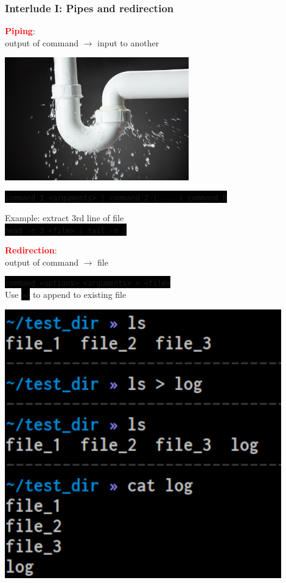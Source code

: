 \documentclass[unknownkeysallowed, 10pt, a4 paper, handout]{beamer}
\newcommand{\focus}[1]{\textbf{\textcolor{red}{#1}}}
\newcommand{\ra}{$\longrightarrow$ }
\newcommand{\code}[1]{\colorbox{black}{\color{green}\texttt{#1}}}
\newcommand{\sidebyside}[5]{
  \begin{minipage}{#1\textwidth}
    #2
  \end{minipage} #3 \begin{minipage}{#4\textwidth}
    #5
  \end{minipage}
}
\begin{document}
\begin{frame}
  \begin{center}
    \frametitle{Interlude I: Pipes and redirection}

    \sidebyside{0.56}{
      \focus{Piping}:\\
      output of command \ra input to another
    }{\hfill}{0.40}{
      \begin{center}
        \includegraphics[width=0.60\textwidth]{pics/pipe.jpg}
      \end{center}
    }

    \code{command\_1 <arguments> | command\_2 | ... | command\_N}\\
    \vspace{2mm}

    Example: extract 3rd line of file\\
    \code{head -n 3 <file> | tail -n 1}

    \vspace{6mm}

    \sidebyside{0.58}{
      \focus{Redirection}:\\
      output of command \ra file
      \vspace{4mm}

      \code{command <options> <arguments> > <file>}\\
      Use \code{>>} to append to existing file
    }{\hspace{8mm}}{0.30}{
      \begin{center}
        \includegraphics[width=0.90\textwidth]{pics/redirection.png}
      \end{center}
    }


\end{center}
\end{frame}
\end{document}
